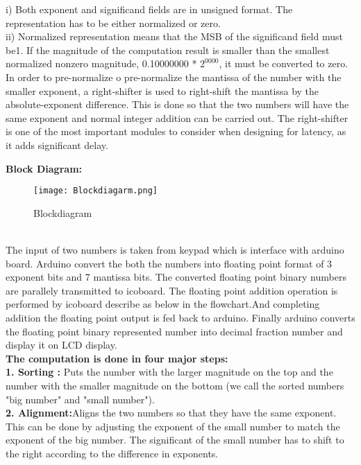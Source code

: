 \documentclass{article}
\begin{document}
i) Both exponent and significand fields are in unsigned format. The representation has to be either normalized or zero.\\
 
ii) Normalized representation means that the MSB of the significand field must be1. If the magnitude of the computation result is smaller than the smallest normalized nonzero magnitude, 0.10000000 * $2^{0000}$, it must be converted to zero. \\
 
	In order to pre-normalize o pre-normalize the mantissa of the number with the smaller exponent, a right-shifter is used to right-shift the mantissa by the absolute-exponent difference. This is done so that the two numbers will have the same exponent and normal integer addition can be carried out. The right-shifter is one of the most important modules to consider when designing for latency, as it adds significant delay.\\
\bigskip 

\textbf{Block Diagram:}
\begin{figure}[htp]
\texttt{[image: Blockdiagarm.png]}
\caption{Blockdiagram}
\end{figure}\\
\bigskip 
The input of two numbers is taken from keypad which is interface with arduino board.
Arduino convert the both the numbers into floating point format of 3 exponent bits and 7 mantissa bits. The converted floating point binary numbers are parallely transmitted to icoboard. 
The floating point addition operation is performed by icoboard describe as below in the flowchart.And completing addition the floating point output is fed back to arduino. Finally arduino converts the floating point binary represented number into decimal fraction number and display it on LCD display.\\
\bigskip 
\textbf{The computation is done in four major steps:} \\
\bigskip 
\textbf{1. Sorting :} Puts the number with the larger magnitude on the top and the number with the smaller magnitude on the bottom (we call the sorted numbers "big number" and "small number").\\
  
\textbf{2. Alignment:}Aligns the two numbers so that they have the same exponent. This can be done by adjusting the exponent of the small number to match the exponent of the big number. The significant of the small number has to shift to the right according to the difference in exponents.\\ 
\end{document}
